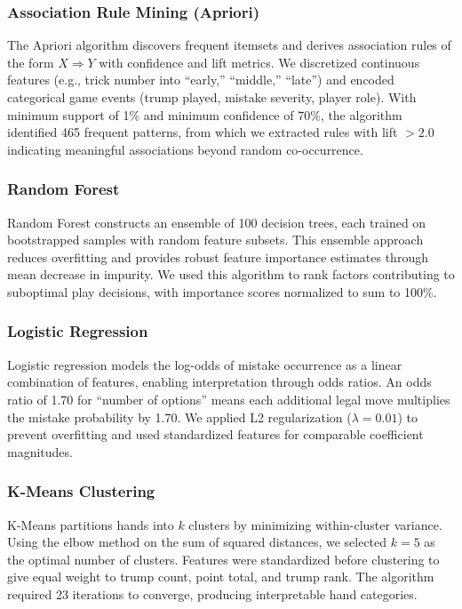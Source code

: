 \documentclass[conference]{IEEEtran}
\begin{document}
\subsubsection{Association Rule Mining (Apriori)}
The Apriori algorithm \cite{agrawal1994fast} discovers frequent itemsets and derives association rules of the form $X \Rightarrow Y$ with confidence and lift metrics. We discretized continuous features (e.g., trick number into ``early,'' ``middle,'' ``late'') and encoded categorical game events (trump played, mistake severity, player role). With minimum support of 1\% and minimum confidence of 70\%, the algorithm identified 465 frequent patterns, from which we extracted rules with lift $> 2.0$ indicating meaningful associations beyond random co-occurrence.

\subsubsection{Random Forest}
Random Forest constructs an ensemble of 100 decision trees, each trained on bootstrapped samples with random feature subsets. This ensemble approach reduces overfitting and provides robust feature importance estimates through mean decrease in impurity. We used this algorithm to rank factors contributing to suboptimal play decisions, with importance scores normalized to sum to 100\%.

\subsubsection{Logistic Regression}
Logistic regression models the log-odds of mistake occurrence as a linear combination of features, enabling interpretation through odds ratios. An odds ratio of 1.70 for ``number of options'' means each additional legal move multiplies the mistake probability by 1.70. We applied L2 regularization ($\lambda = 0.01$) to prevent overfitting and used standardized features for comparable coefficient magnitudes.

\subsubsection{K-Means Clustering}
K-Means partitions hands into $k$ clusters by minimizing within-cluster variance. Using the elbow method on the sum of squared distances, we selected $k=5$ as the optimal number of clusters. Features were standardized before clustering to give equal weight to trump count, point total, and trump rank. The algorithm required 23 iterations to converge, producing interpretable hand categories.
\end{document}
